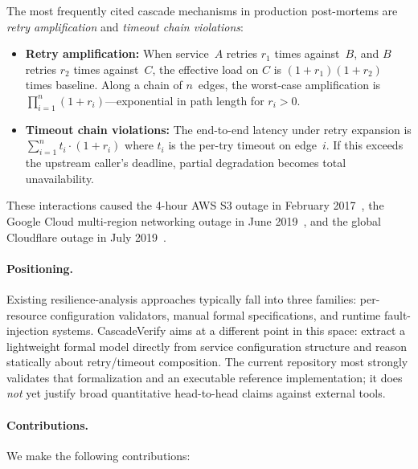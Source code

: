 \documentclass[10pt,twocolumn]{article}
\begin{document}
The most frequently cited cascade mechanisms in production post-mortems are
\emph{retry amplification} and \emph{timeout chain violations}:

\begin{itemize}[nosep]
\item \textbf{Retry amplification:} When service~$A$ retries $r_1$ times
  against~$B$, and $B$ retries $r_2$ times against~$C$, the effective load on
  $C$ is $(1+r_1)(1+r_2)$ times baseline. Along a chain of $n$~edges, the
  worst-case amplification is $\prod_{i=1}^{n}(1+r_i)$---exponential in path
  length for $r_i > 0$.

\item \textbf{Timeout chain violations:} The end-to-end latency under retry
  expansion is $\sum_{i=1}^{n} t_i \cdot (1+r_i)$ where $t_i$ is the per-try
  timeout on edge~$i$. If this exceeds the upstream caller's deadline, partial
  degradation becomes total unavailability.
\end{itemize}

These interactions caused the 4-hour AWS S3 outage in February
2017~\cite{aws2017}, the Google Cloud multi-region networking outage in June
2019~\cite{google2019}, and the global Cloudflare outage in July
2019~\cite{cloudflare2019}.

\paragraph{Positioning.}
Existing resilience-analysis approaches typically fall into three families:
per-resource configuration validators, manual formal specifications, and runtime
fault-injection systems.  CascadeVerify aims at a different point in this
space: extract a lightweight formal model directly from service configuration
structure and reason statically about retry/timeout composition.  The current
repository most strongly validates that formalization and an executable
reference implementation; it does \emph{not} yet justify broad quantitative
head-to-head claims against external tools.

\paragraph{Contributions.} We make the following contributions:
\end{document}
